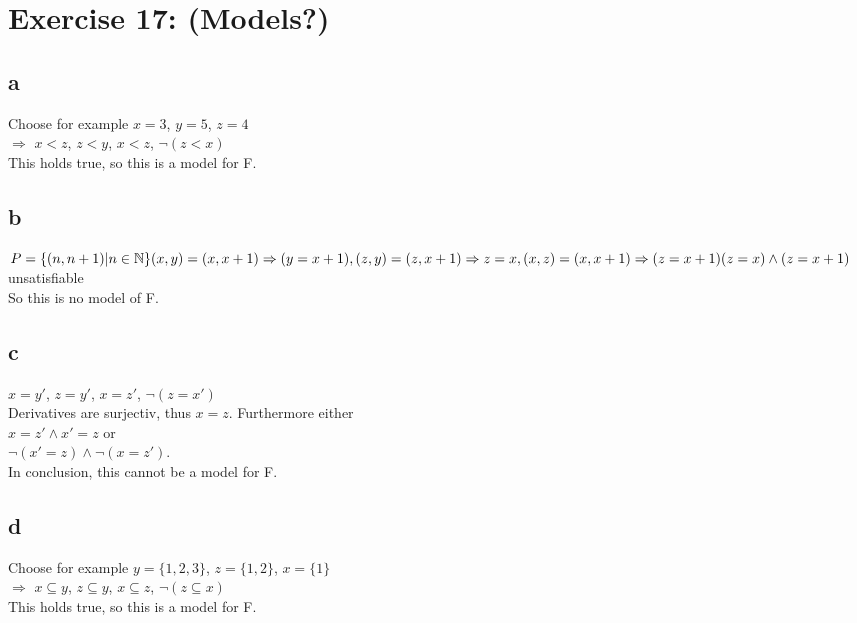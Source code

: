 \documentclass[12pt]{article}
\newcommand{\N}{\mathbb N}
\begin{document}
 

\rhead{\today}


\section*{Exercise 17: (Models?)}

\subsection*{a}

Choose for example $x=3$, $y=5$, $z=4$\\
$\Rightarrow$ $x<z$, $z<y$, $x<z$, $\lnot (z < x)$\\
This holds true, so this is a model for F.

\subsection*{b}
$P=\{(n,n+1)| n \in \N \} \\
(x,y) = (x,x+1) \Rightarrow (y=x+1), \\
(z,y)=(z,x+1) \Rightarrow z=x, \\
(x,z)=(x,x+1) \Rightarrow (z=x+1)\\
(z=x)\land(z=x+1)$ unsatisfiable\\
So this is no model of F.



\subsection*{c}

$x=y'$, $z=y'$, $x=z'$, $\lnot(z=x')$\\
Derivatives are surjectiv, thus $x=z$. Furthermore either\\
$x=z' \land x'=z$ or\\
$\lnot(x'=z) \land \lnot(x=z')$.\\
In conclusion, this cannot be a model for F.

\subsection*{d}

Choose for example $y = \{1,2,3\}$, $z=\{1,2\}$, $x=\{1\}$\\
$\Rightarrow$ $x \subseteq y$, $z \subseteq y$, $x \subseteq z$, $\lnot (z \subseteq x)$\\
This holds true, so this is a model for F.
\end{document}

